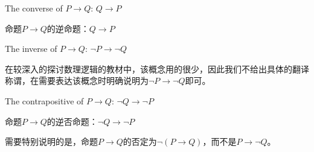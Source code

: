\documentclass{beamer}
\begin{document}
\begin{CJK*}{UTF8}{gbsn}
\begin{frame}
  The converse of $P\to Q$: $Q \to P$

  命题$P\to Q$的逆命题：$Q\to P$



  The inverse of $P\to Q$: $\lnot P \to \lnot Q$
  
  在较深入的探讨数理逻辑的教材中，该概念用的很少，因此我们不给出具体的翻译称谓，在需要表达该概念时明确说明为$\lnot P \to \lnot Q$即可。

  
  The contrapositive of $P\to Q$: $\lnot Q \to \lnot P$

  命题$P\to Q$的逆否命题：$\lnot Q \to \lnot P$

  需要特别说明的是，命题$P\to Q$的否定为$\lnot (P \to Q)$，而不是$P \to \lnot Q$。 
\end{frame}
\end{CJK*}
\end{document}
